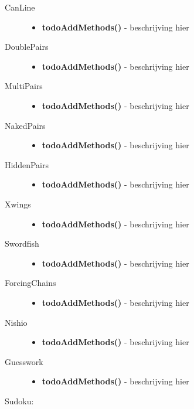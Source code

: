 \documentclass{article}
\begin{document}
\begin{description}
\begin{itemize}
    \end{itemize}
    \item[CanLine] \hfill 
    \begin{itemize}
        \item \textbf{todoAddMethods()} - beschrijving hier
    \end{itemize}
    \item[DoublePairs] \hfill 
    \begin{itemize}
        \item \textbf{todoAddMethods()} - beschrijving hier
    \end{itemize}
    \item[MultiPairs] \hfill 
    \begin{itemize}
        \item \textbf{todoAddMethods()} - beschrijving hier
    \end{itemize}
    \item[NakedPairs] \hfill 
    \begin{itemize}
        \item \textbf{todoAddMethods()} - beschrijving hier
    \end{itemize}
    \item[HiddenPairs] \hfill
    \begin{itemize}
        \item \textbf{todoAddMethods()} - beschrijving hier
    \end{itemize}
    \item[Xwings] \hfill
    \begin{itemize}
        \item \textbf{todoAddMethods()} - beschrijving hier
    \end{itemize}
    \item[Swordfish] \hfill
    \begin{itemize}
        \item \textbf{todoAddMethods()} - beschrijving hier
    \end{itemize}
    \item[ForcingChains] \hfill
    \begin{itemize}
        \item \textbf{todoAddMethods()} - beschrijving hier
    \end{itemize}
    \item[Nishio] \hfill
    \begin{itemize}
        \item \textbf{todoAddMethods()} - beschrijving hier
    \end{itemize}
    \item[Guesswork] \hfill 
    \begin{itemize}
        \item \textbf{todoAddMethods()} - beschrijving hier
    \end{itemize}
\end{description}
Sudoku:
\end{document}
